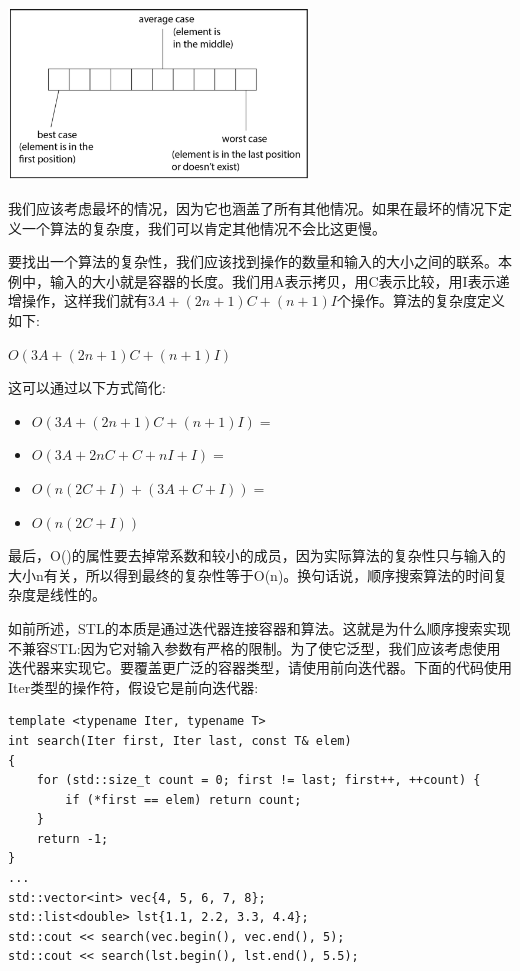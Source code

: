 \begin{center}
	\includegraphics[width=0.6\textwidth]{content/Section-2/Chapter-6/20}
\end{center}

我们应该考虑最坏的情况，因为它也涵盖了所有其他情况。如果在最坏的情况下定义一个算法的复杂度，我们可以肯定其他情况不会比这更慢。 \par
要找出一个算法的复杂性，我们应该找到操作的数量和输入的大小之间的联系。本例中，输入的大小就是容器的长度。我们用A表示拷贝，用C表示比较，用I表示递增操作，这样我们就有$3A + (2n + 1)C + (n + 1)I$个操作。算法的复杂度定义如下: \par 

$O(3A + (2n + 1)C + (n + 1)I)$

这可以通过以下方式简化: \par

\begin{itemize}
	\item $O(3A + (2n + 1)C + (n + 1)I) =$
	\item $O(3A + 2nC + C + nI + I) =$
	\item $O(n(2C + I) + (3A + C + I)) =$
	\item $O(n(2C + I))$
\end{itemize}

最后，O()的属性要去掉常系数和较小的成员，因为实际算法的复杂性只与输入的大小n有关，所以得到最终的复杂性等于O(n)。换句话说，顺序搜索算法的时间复杂度是线性的。 \par
如前所述，STL的本质是通过迭代器连接容器和算法。这就是为什么顺序搜索实现不兼容STL:因为它对输入参数有严格的限制。为了使它泛型，我们应该考虑使用迭代器来实现它。要覆盖更广泛的容器类型，请使用前向迭代器。下面的代码使用Iter类型的操作符，假设它是前向迭代器: \par

\begin{lstlisting}[caption={}]
template <typename Iter, typename T>
int search(Iter first, Iter last, const T& elem)
{
	for (std::size_t count = 0; first != last; first++, ++count) {
		if (*first == elem) return count;
	}
	return -1;
}
...
std::vector<int> vec{4, 5, 6, 7, 8};
std::list<double> lst{1.1, 2.2, 3.3, 4.4};
std::cout << search(vec.begin(), vec.end(), 5);
std::cout << search(lst.begin(), lst.end(), 5.5);
\end{lstlisting}

